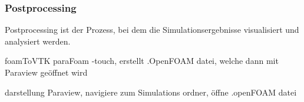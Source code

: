 \subsubsection{Postprocessing}
Postprocessing ist der Prozess, bei dem die Simulationsergebnisse visualisiert und analysiert werden. 



foamToVTK
paraFoam -touch, erstellt .OpenFOAM datei, welche dann mit Paraview geöffnet wird

darstellung
Paraview, navigiere zum Simulations ordner, öffne .openFOAM datei